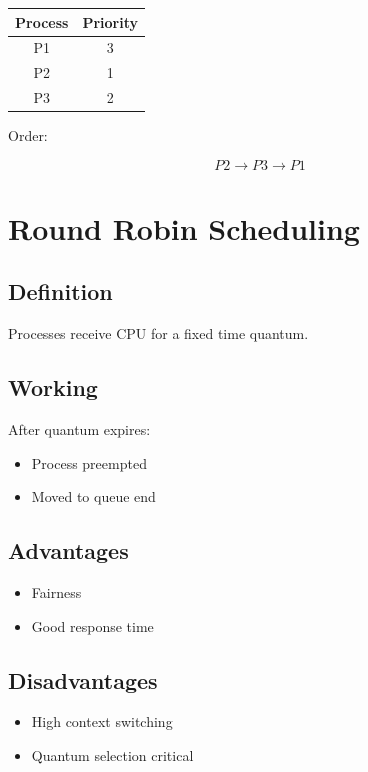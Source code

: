 \begin{table}[H]
\centering
\begin{tabular}{|c|c|}
\hline
Process & Priority \\
\hline
P1 & 3\\
P2 & 1\\
P3 & 2\\
\hline
\end{tabular}
\end{table}

Order:

\[
P2 \rightarrow P3 \rightarrow P1
\]

\section{Round Robin Scheduling}

\subsection{Definition}

Processes receive CPU for a fixed time quantum.

\subsection{Working}

After quantum expires:

\begin{itemize}
\item Process preempted
\item Moved to queue end
\end{itemize}

\subsection{Advantages}

\begin{itemize}
\item Fairness
\item Good response time
\end{itemize}

\subsection{Disadvantages}

\begin{itemize}
\item High context switching
\item Quantum selection critical
\end{itemize}

